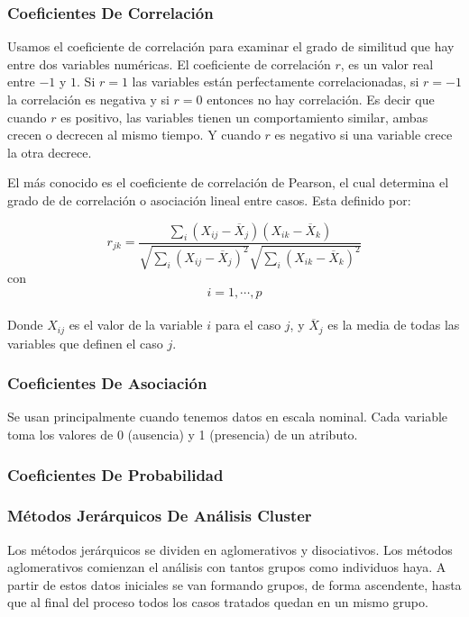 \subsubsection*{Coeficientes De Correlación}

Usamos el coeficiente de correlación para examinar el grado de similitud que hay entre dos variables numéricas.  El coeficiente de correlación $r$, es un valor real entre $-1$ y $1$.  Si $r=1$ las variables están perfectamente correlacionadas, si $r=-1$ la correlación es negativa y si $r=0$ entonces no hay correlación.  Es decir que cuando $r$ es positivo, las variables tienen un comportamiento similar, ambas crecen o decrecen al mismo tiempo.  Y cuando $r$ es negativo si una variable crece la otra decrece. 

El más conocido es el coeficiente de correlación de Pearson, el cual determina el grado de de correlación o asociación lineal entre casos.  Esta definido por:

$$r_{jk}=\dfrac{\sum \limits_{i}(X_{ij}-\overline{X}_{j})(X_{ik}-\overline{X}_{k})}{\sqrt{\sum \limits_{i}(X_{ij}-\overline{X}_{j})^2} \sqrt{\sum \limits_{i}(X_{ik}-\overline{X}_{k})^2}}$$ con $$i= 1,\cdots,p$$
\ \\
Donde $X_{ij}$ es el valor de la variable $i$ para el caso $j$, y $\overline{X}_j$ es la media de todas las variables que definen el caso $j$.  



\subsubsection*{Coeficientes De Asociación}

Se usan principalmente cuando tenemos datos en escala nominal.  Cada variable toma los valores de 0 (ausencia) y 1 (presencia) de un atributo.
 
 \subsubsection*{Coeficientes De Probabilidad}
 
 \subsubsection{Métodos Jerárquicos De Análisis Cluster}

 Los métodos jerárquicos se dividen en aglomerativos y disociativos.  Los métodos aglomerativos comienzan el análisis con tantos grupos como individuos haya.  A partir de estos datos iniciales se van formando grupos, de forma ascendente, hasta que al final del proceso todos los casos tratados quedan en un mismo grupo.\par

